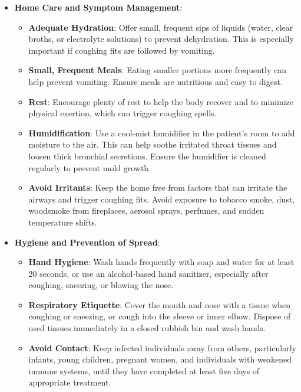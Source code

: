 \begin{itemize}
    \item \textbf{Home Care and Symptom Management}:
    \begin{itemize}
        \item \textbf{Adequate Hydration}: Offer small, frequent sips of liquids (water, clear broths, or electrolyte solutions) to prevent dehydration. This is especially important if coughing fits are followed by vomiting.
        \item \textbf{Small, Frequent Meals}: Eating smaller portions more frequently can help prevent vomiting. Ensure meals are nutritious and easy to digest.
        \item \textbf{Rest}: Encourage plenty of rest to help the body recover and to minimize physical exertion, which can trigger coughing spells.
        \item \textbf{Humidification}: Use a cool-mist humidifier in the patient's room to add moisture to the air. This can help soothe irritated throat tissues and loosen thick bronchial secretions. Ensure the humidifier is cleaned regularly to prevent mold growth.
        \item \textbf{Avoid Irritants}: Keep the home free from factors that can irritate the airways and trigger coughing fits. Avoid exposure to tobacco smoke, dust, woodsmoke from fireplaces, aerosol sprays, perfumes, and sudden temperature shifts.
    \end{itemize}

    \item \textbf{Hygiene and Prevention of Spread}:
    \begin{itemize}
        \item \textbf{Hand Hygiene}: Wash hands frequently with soap and water for at least 20 seconds, or use an alcohol-based hand sanitizer, especially after coughing, sneezing, or blowing the nose.
        \item \textbf{Respiratory Etiquette}: Cover the mouth and nose with a tissue when coughing or sneezing, or cough into the sleeve or inner elbow. Dispose of used tissues immediately in a closed rubbish bin and wash hands.
        \item \textbf{Avoid Contact}: Keep infected individuals away from others, particularly infants, young children, pregnant women, and individuals with weakened immune systems, until they have completed at least five days of appropriate treatment.
    \end{itemize}
\end{itemize}

